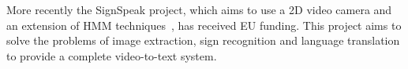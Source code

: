 More recently the SignSpeak project, which aims to use a 2D video camera and an extension of HMM techniques~\citep{dreuw2009smoothed, dreuw2010signspeak}, has received EU funding. This project aims to solve the problems of image extraction, sign recognition and language translation to provide a complete video-to-text system.



